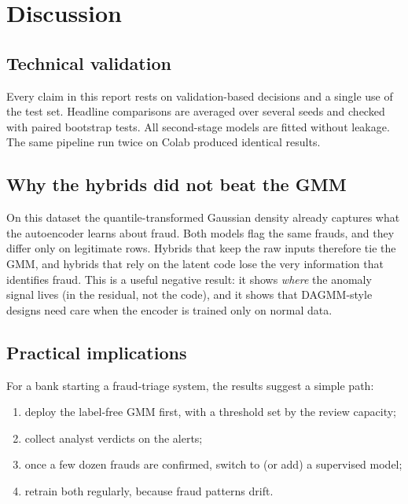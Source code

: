 \documentclass[12pt]{article}
\begin{document}
\section{Discussion}\label{sec:disc}

\subsection{Technical validation}
Every claim in this report rests on validation-based decisions and a single use of the test set. Headline comparisons
are averaged over several seeds and checked with paired bootstrap tests. All second-stage models are fitted without
leakage. The same pipeline run twice on Colab produced identical results.

\subsection{Why the hybrids did not beat the GMM}
On this dataset the quantile-transformed Gaussian density already captures what the autoencoder learns about fraud.
Both models flag the same frauds, and they differ only on legitimate rows. Hybrids that keep the raw inputs therefore
tie the GMM, and hybrids that rely on the latent code lose the very information that identifies fraud. This is a useful
negative result: it shows \emph{where} the anomaly signal lives (in the residual, not the code), and it shows that
DAGMM-style designs need care when the encoder is trained only on normal data.

\subsection{Practical implications}
For a bank starting a fraud-triage system, the results suggest a simple path:
\begin{enumerate}
\item deploy the label-free GMM first, with a threshold set by the review capacity;
\item collect analyst verdicts on the alerts;
\item once a few dozen frauds are confirmed, switch to (or add) a supervised model;
\item retrain both regularly, because fraud patterns drift.
\end{enumerate}
\end{document}
